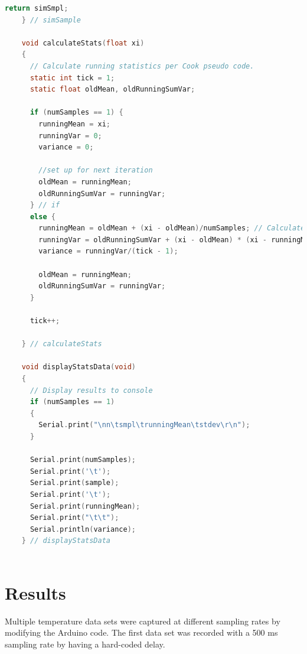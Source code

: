 \documentclass[journal]{IEEEtran}
\begin{document}
\begin{lstlisting}[language=c]
      return simSmpl; 
    } // simSample
    
    void calculateStats(float xi)
    {
      // Calculate running statistics per Cook pseudo code.
      static int tick = 1;
      static float oldMean, oldRunningSumVar;
      
      if (numSamples == 1) {
        runningMean = xi;
        runningVar = 0;
        variance = 0;
    
        //set up for next iteration
        oldMean = runningMean;
        oldRunningSumVar = runningVar;
      } // if
      else {
        runningMean = oldMean + (xi - oldMean)/numSamples; // Calculate Mean
        runningVar = oldRunningSumVar + (xi - oldMean) * (xi - runningMean); // Calculate Variance
        variance = runningVar/(tick - 1);
    
        oldMean = runningMean;
        oldRunningSumVar = runningVar;
      }
      
      tick++;
      
    } // calculateStats
    
    void displayStatsData(void)
    {
      // Display results to console
      if (numSamples == 1)
      {
        Serial.print("\nn\tsmpl\trunningMean\tstdev\r\n");
      }
    
      Serial.print(numSamples);
      Serial.print('\t');
      Serial.print(sample);
      Serial.print('\t');
      Serial.print(runningMean);
      Serial.print("\t\t");
      Serial.println(variance);
    } // displayStatsData
    
\end{lstlisting}

\section{Results}
Multiple temperature data sets were captured at different sampling rates by modifying the Arduino code. The first data set was recorded with a 500 ms sampling rate by having a hard-coded delay.
\end{document}

